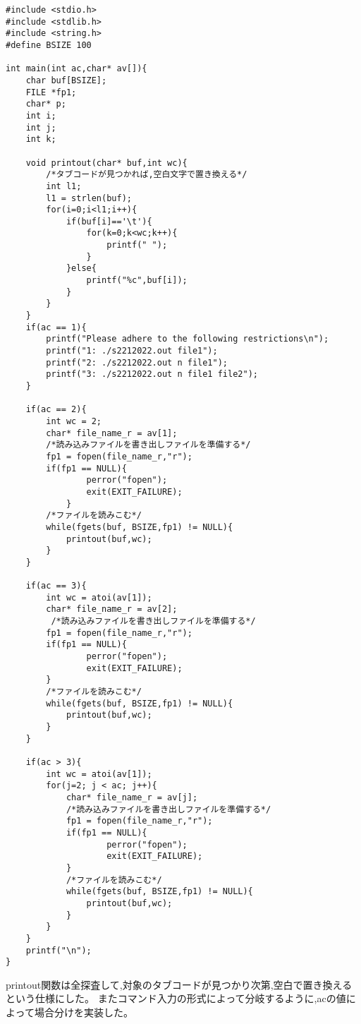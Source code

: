\documentclass[fontsize = 10pt, paper= a4]{jlreq}
\begin{document}
\begin{lstlisting}[basicstyle=\ttfamily\footnotesize, frame=single, caption=s2212022-1.c ,label=s2212022-1.c]
#include <stdio.h>
#include <stdlib.h>
#include <string.h>
#define BSIZE 100

int main(int ac,char* av[]){
    char buf[BSIZE];
    FILE *fp1;
    char* p;
    int i;
    int j;
    int k;

    void printout(char* buf,int wc){
        /*タブコードが見つかれば,空白文字で置き換える*/
        int l1;
        l1 = strlen(buf);
        for(i=0;i<l1;i++){
            if(buf[i]=='\t'){
                for(k=0;k<wc;k++){
                    printf(" ");
                }
            }else{
                printf("%c",buf[i]);
            }
        }
    }
    if(ac == 1){
        printf("Please adhere to the following restrictions\n");
        printf("1: ./s2212022.out file1");
        printf("2: ./s2212022.out n file1");
        printf("3: ./s2212022.out n file1 file2");
    }

    if(ac == 2){
        int wc = 2;
        char* file_name_r = av[1];
        /*読み込みファイルを書き出しファイルを準備する*/
        fp1 = fopen(file_name_r,"r");
        if(fp1 == NULL){
                perror("fopen");
                exit(EXIT_FAILURE);
            }
        /*ファイルを読みこむ*/
        while(fgets(buf, BSIZE,fp1) != NULL){
            printout(buf,wc);
        }   
    }

    if(ac == 3){
        int wc = atoi(av[1]);
        char* file_name_r = av[2];
         /*読み込みファイルを書き出しファイルを準備する*/
        fp1 = fopen(file_name_r,"r");
        if(fp1 == NULL){
                perror("fopen");
                exit(EXIT_FAILURE);
        }
        /*ファイルを読みこむ*/
        while(fgets(buf, BSIZE,fp1) != NULL){
            printout(buf,wc);
        } 
    }

    if(ac > 3){
        int wc = atoi(av[1]);
        for(j=2; j < ac; j++){
            char* file_name_r = av[j];
            /*読み込みファイルを書き出しファイルを準備する*/
            fp1 = fopen(file_name_r,"r");
            if(fp1 == NULL){
                    perror("fopen");
                    exit(EXIT_FAILURE);
            }
            /*ファイルを読みこむ*/
            while(fgets(buf, BSIZE,fp1) != NULL){
                printout(buf,wc);
            }
        }    
    }   
    printf("\n"); 
}
\end{lstlisting}

printout関数は全探査して,対象のタブコードが見つかり次第,空白で置き換えるという仕様にした。
またコマンド入力の形式によって分岐するように,acの値によって場合分けを実装した。
\end{document}
